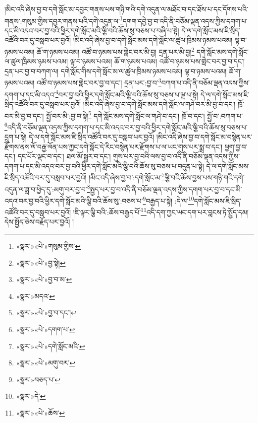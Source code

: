 །མིང་འདི་ཞེས་བྱ་བ་དགེ་སློང་མ་དབྱར་གནས་པས་གཉི་གའི་དགེ་འདུན་ལ་མཐོང་བ་དང་ཐོས་པ་དང་དོགས་པའི་གནས་:གསུམ་གྱིས་དབྱར་གནས་པའི་དགེ་འདུན་ལ་\footnote{«སྣར་»«པེ་»གསུམ་གྱིས་}དགག་དབྱེ་བྱ་བ་འདི་ནི་བཅོམ་ལྡན་འདས་ཀྱིས་དགག་པ་དང་མི་འདའ་བར་བྱ་བའི་ཕྱིར་དགེ་སློང་མའི་ལྕི་བའི་ཆོས་སུ་བཅས་པ་བཞི་པ་སྟེ། དེ་ལ་དགེ་སློང་མས་ཇི་སྲིད་འཚོའི་བར་དུ་བསླབ་པར་བྱའོ། །མིང་འདི་ཞེས་བྱ་བ་དགེ་སློང་མས་དགེ་སློང་ལ་ཚུལ་ཁྲིམས་ཉམས་པའམ། ལྟ་བ་ཉམས་པའམ། ཆོ་ག་ཉམས་པའམ། འཚོ་བ་ཉམས་པས་གླེང་བར་མི་བྱ། དྲན་པར་མི་བྱ།\footnote{«སྣར་»«པེ་»བྱ་སྟེ།} དགེ་སློང་མས་དགེ་སློང་ལ་ཚུལ་ཁྲིམས་ཉམས་པའམ། ལྟ་བ་ཉམས་པའམ། ཆོ་ག་ཉམས་པའམ། འཚོ་བ་ཉམས་པས་གླེང་བར་བྱ་བ་དང་། དྲན་པར་བྱ་བ་བཀག་ལ། དགེ་སློང་གིས་དགེ་སློང་མ་ལ་ཚུལ་ཁྲིམས་ཉམས་པའམ། ལྟ་བ་ཉམས་པའམ། ཆོ་ག་ཉམས་པའམ། འཚོ་བ་ཉམས་པས་གླེང་བར་བྱ་བ་དང་། དྲན་པར་:བྱ་བ་\footnote{«སྣར་»«པེ་»བྱ་བ་མ་}བཀག་པ་འདི་ནི་བཅོམ་ལྡན་འདས་ཀྱིས་དགག་པ་དང་མི་འདའ་\footnote{«སྣར་»མདའ་}བར་བྱ་བའི་ཕྱིར་དགེ་སློང་མའི་ལྕི་བའི་ཆོས་སུ་བཅས་པ་ལྔ་པ་སྟེ། དེ་ལ་དགེ་སློང་མས་ཇི་སྲིད་འཚོའི་བར་དུ་བསླབ་པར་བྱའོ། །མིང་འདི་ཞེས་བྱ་བ་དགེ་སློང་མས་དགེ་སློང་ལ་གཤེ་བར་མི་བྱ་བ་དང་། ཁྲོ་བར་མི་བྱ་བ་དང་། སྤྱོ་བར་མི་:བྱ་བ་སྟེ།\footnote{«སྣར་»«པེ་»བྱ་བ་དང་།} དགེ་སློང་མས་དགེ་སློང་ལ་གཤེ་བ་དང་། ཁྲོ་བ་དང་། སྤྱོ་བ་:བཀག་པ་\footnote{«སྣར་»«པེ་»དགག་པ་}འདི་ནི་བཅོམ་ལྡན་འདས་ཀྱིས་དགག་པ་དང་མི་འདའ་བར་བྱ་བའི་ཕྱིར་དགེ་སློང་མའི་ལྕི་བའི་ཆོས་སུ་བཅས་པ་དྲུག་པ་སྟེ། དེ་ལ་དགེ་སློང་མས་ཇི་སྲིད་འཚོའི་བར་དུ་བསླབ་པར་བྱའོ། །མིང་འདི་ཞེས་བྱ་བ་དགེ་སློང་མ་བསྙེན་པར་རྫོགས་ནས་ལོ་བརྒྱ་ལོན་པས་ཀྱང་དགེ་སློང་དེ་རིང་བསྙེན་པར་རྫོགས་པ་ལ་ཡང་གུས་པར་སྨྲ་བ་དང་། ཕྱག་བྱ་བ་དང་། དང་པོར་ལྡང་བ་དང་། ཐལ་མོ་སྦྱར་བ་དང་། གུས་པར་བྱ་བའི་ལས་བྱ་བ་འདི་ནི་བཅོམ་ལྡན་འདས་ཀྱིས་དགག་པ་དང་མི་འདའ་བར་བྱ་བའི་ཕྱིར་དགེ་སློང་མའི་ལྕི་བའི་ཆོས་སུ་བཅས་པ་བདུན་པ་སྟེ། དེ་ལ་དགེ་སློང་མས་ཇི་སྲིད་འཚོའི་བར་དུ་བསླབ་པར་བྱའོ། །མིང་འདི་ཞེས་བྱ་བ་:དགེ་སློང་མ་\footnote{«སྣར་»«པེ་»དགེ་སློང་མའི་}ལྕི་བའི་ཆོས་བྱས་པས་གཉི་གའི་དགེ་འདུན་ལ་ཟླ་བ་ཕྱེད་དུ་:མགུ་བར་བྱ་བ་\footnote{«སྣར་»«པེ་»མགུ་བར་}སྤྱད་པར་བྱ་བ་འདི་ནི་བཅོམ་ལྡན་འདས་ཀྱིས་དགག་པར་བྱ་བ་དང་མི་འདའ་བར་བྱ་བའི་ཕྱིར་དགེ་སློང་མའི་ལྕི་བའི་ཆོས་སུ་:བཅས་པ་\footnote{«སྣར་»བཅད་པ་}བརྒྱད་པ་སྟེ། :དེ་ལ་\footnote{«སྣར་»དེ་}དགེ་སློང་མས་ཇི་སྲིད་འཚོའི་བར་དུ་བསླབ་པར་བྱའོ། །ཇི་ལྟར་ལྕི་བའི་:ཆོས་བརྒྱད་པོ་\footnote{«སྣར་»«པེ་»ཆོས་}འདི་དག་ཀྱང་ཡང་དག་པར་བླངས་ཏེ་སྤྱོད་དམ། དེས་སྤྱོད་ཅེས་བརྗོད་པར་བྱའོ། །
